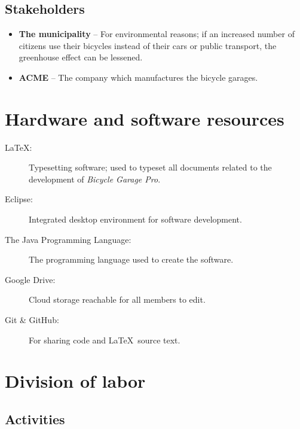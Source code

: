 \documentclass[12pt,titlepage]{article}
\begin{document}
\subsection{Stakeholders}

\begin{itemize}
	\item \textbf{The municipality} -- For environmental reasons; if an
		increased number of citizens use their bicycles instead of their
		cars or public transport, the greenhouse effect can be lessened.
	\item \textbf{ACME} -- The company which manufactures the bicycle
		garages.
\end{itemize}


\section{Hardware and software resources}
\label{sec:hardware-and-software-resources}

\begin{description}
	\item[\LaTeX:] Typesetting software; used to typeset all documents
		related to the development of \textit{Bicycle Garage Pro}.
	\item[Eclipse:] Integrated desktop environment for software development.
	\item[The Java Programming Language:] The programming language used to
		create the software.
	\item[Google Drive:] Cloud storage reachable for all members to edit.
	\item[Git \& GitHub:] For sharing code and \LaTeX~source text.
\end{description}


\section{Division of labor}

\subsection{Activities}
\end{document}
